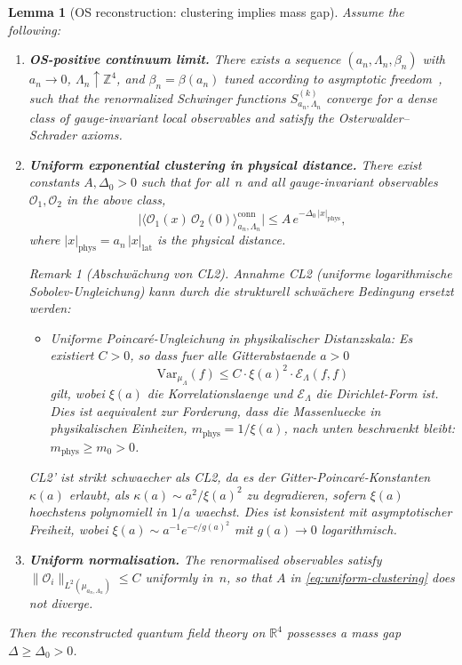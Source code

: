 \documentclass[12pt,a4paper]{article}
\theoremstyle{definition}
\theoremstyle{plain}
\newtheorem{lemma}[definition]{Lemma}
\theoremstyle{remark}
\newtheorem{remark}[definition]{Remark}
\begin{document}
\begin{lemma}[OS reconstruction: clustering implies mass gap]
\label{thm:continuum-gap}
Assume the following:
\begin{enumerate}
    \item[\textup{(CL1)}] \textbf{OS-positive continuum limit.}  There exists a sequence $(a_n, \Lambda_n, \beta_n)$ with $a_n \to 0$, $\Lambda_n \uparrow \mathbb{Z}^4$, and $\beta_n = \beta(a_n)$ tuned according to asymptotic freedom~\cite{GrossWilczek1973,Politzer1973}, such that the renormalized Schwinger functions $S^{(k)}_{a_n,\Lambda_n}$ converge for a dense class of gauge-invariant local observables and satisfy the Osterwalder--Schrader axioms.
    \item[\textup{(CL2)}] \textbf{Uniform exponential clustering in physical distance.}  There exist constants $A, \Delta_0 > 0$ such that for all~$n$ and all gauge-invariant observables $\mathcal{O}_1, \mathcal{O}_2$ in the above class,
    \begin{equation}\label{eq:uniform-clustering}
        \bigl|\langle \mathcal{O}_1(x)\,\mathcal{O}_2(0)\rangle_{a_n,\Lambda_n}^{\mathrm{conn}}\bigr|
        \leq A\,e^{-\Delta_0\,|x|_{\mathrm{phys}}},
    \end{equation}
    where $|x|_{\mathrm{phys}} = a_n\,|x|_{\mathrm{lat}}$ is the physical distance.

\begin{remark}[Abschwächung von CL2]
\label{rem:cl2-relaxation}
Annahme CL2 (uniforme logarithmische Sobolev-Ungleichung) kann durch die strukturell schwächere Bedingung ersetzt werden:
\begin{itemize}
\item[\textbf{CL2'.}] \emph{Uniforme Poincar\'e-Ungleichung in physikalischer Distanzskala:} Es existiert $C > 0$, so dass fuer alle Gitterabstaende $a > 0$
\[
\mathrm{Var}_{\mu_\Lambda}(f) \leq C \cdot \xi(a)^2 \cdot \mathcal{E}_\Lambda(f, f)
\]
gilt, wobei $\xi(a)$ die Korrelationslaenge und $\mathcal{E}_\Lambda$ die Dirichlet-Form ist. Dies ist aequivalent zur Forderung, dass die Massenluecke in physikalischen Einheiten, $m_{\mathrm{phys}} = 1/\xi(a)$, nach unten beschraenkt bleibt: $m_{\mathrm{phys}} \geq m_0 > 0$.
\end{itemize}
CL2' ist strikt schwaecher als CL2, da es der Gitter-Poincar\'e-Konstanten $\kappa(a)$ erlaubt, als $\kappa(a) \sim a^2/\xi(a)^2$ zu degradieren, sofern $\xi(a)$ hoechstens polynomiell in $1/a$ waechst. Dies ist konsistent mit asymptotischer Freiheit, wobei $\xi(a) \sim a^{-1} e^{-c/g(a)^2}$ mit $g(a) \to 0$ logarithmisch.
\end{remark}

    \item[\textup{(CL3)}] \textbf{Uniform normalisation.}  The renormalised observables satisfy $\|\mathcal{O}_i\|_{L^2(\mu_{a_n,\Lambda_n})} \leq C$ uniformly in~$n$, so that $A$ in \eqref{eq:uniform-clustering} does not diverge.
\end{enumerate}
Then the reconstructed quantum field theory on $\mathbb{R}^4$ possesses a mass gap $\Delta \geq \Delta_0 > 0$.
\end{lemma}
\end{document}
